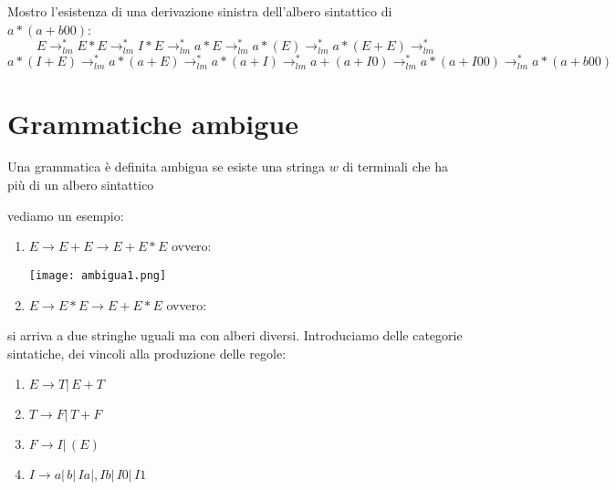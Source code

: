\begin{example}
	Mostro l'esistenza di una derivazione sinistra dell'albero sintattico di $a*(a+b00)$:
	$$E\to^*_{lm}E*E\to^*_{lm}I*E\to^*_{lm}a*E\to^*_{lm}a*(E)\to^*_{lm}a*(E+E)\to^*_{lm}$$
	$$a*(I+E)\to^*_{lm}a*(a+E)\to^*_{lm}a*(a+I)\to^*_{lm}a+(a+I0)\to^*_{lm}a*(a+I00)\to^*_{lm}a*(a+b00)$$
\end{example}
\section{Grammatiche ambigue}
\begin{definition}
	Una grammatica è definita ambigua se esiste una stringa $w$ di terminali che ha più di un albero sintattico
\end{definition}
\begin{example}
	vediamo un esempio:
	\begin{enumerate}
		\item $E\to E+E\to E+E*E$
					ovvero:
					\begin{center}
\texttt{[image: ambigua1.png]}
					\end{center}
		\item $E\to E*E\to E+E*E$
					ovvero:
					\begin{center}
					\end{center}
	\end{enumerate}
	si arriva a due stringhe uguali ma con alberi diversi. Introduciamo delle categorie sintatiche, dei vincoli alla produzione delle regole:
	\begin{enumerate}
		\item $E\to T|\, E+T$
		\item $T\to F|\, T+F$
		\item $F\to I|\, (E)$
		\item $I\to a|\,b|\,Ia|,Ib|\,I0|\,I1$
	\end{enumerate}
\end{example}
